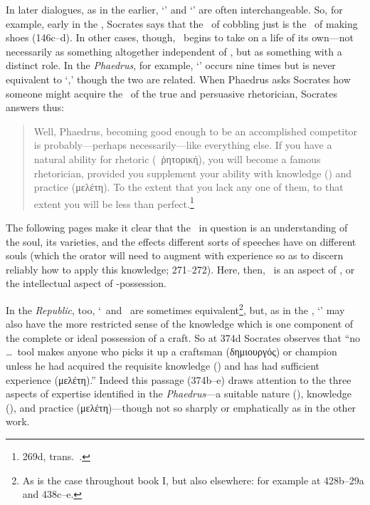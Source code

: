 \documentclass[11pt,letterpaper,oneside]{amsart} %
\begin{document}
In later dialogues, as in the earlier, `\episteme' and `\techne' are often interchangeable. So, for example, early in the , Socrates says that the \techne\ of cobbling just is the \episteme\ of making shoes (146c--d). In other cases, though, \episteme\ begins to take on a life of its own---not necessarily as something altogether independent of \techne, but as something with a distinct role. In the \emph{Phaedrus}, for example, `\episteme' occurs nine times but is never equivalent to `\techne,' though the two are related. When Phaedrus asks Socrates how someone might acquire the \techne\ of the true and persuasive rhetorician, Socrates answers thus:\begin{quote}Well, Phaedrus, becoming good enough to be an accomplished competitor is probably---perhaps necessarily---like everything else. If you have a natural ability for rhetoric (\phusis\ ῥητορική), you will become a famous rhetorician, provided you supplement your ability with knowledge (\episteme) and practice (μελέτη). To the extent that you lack any one of them, to that extent you will be less than perfect.\footnote{269d, trans.\ .}\end{quote}The following pages make it clear that the \episteme\ in question is an understanding of the soul, its varieties, and the effects different sorts of speeches have on different souls (which the orator will need to augment with experience so as to discern reliably how to apply this knowledge; 271--272). Here, then, \episteme\ is an aspect of \techne, or the intellectual aspect of \techne-possession. 

In the \emph{Republic}, too, `\episteme\ and \techne\ are sometimes equivalent\footnote{As is the case throughout book I, but also elsewhere: for example at 428b--29a and 438c--e.}, but, as in the , `\episteme' may also have the more restricted sense of the knowledge which is one component of the complete or ideal possession of a craft. So at 374d Socrates observes that ``no \ldots\ tool makes anyone who picks it up a craftsman (δημιουργός) or champion unless he had acquired the requisite knowledge (\episteme) and has had sufficient experience (μελέτη).'' Indeed this passage (374b--e) draws attention to the three aspects of expertise identified in the \emph{Phaedrus}---a suitable nature (\phusis), knowledge (\episteme), and practice (μελέτη)---though not so sharply or emphatically as in the other work.
\end{document}
